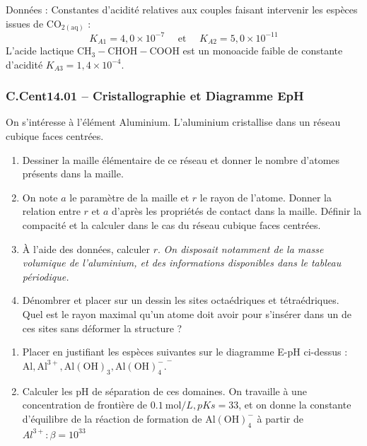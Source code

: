 Données :
Constantes d'acidité relatives aux couples faisant intervenir les espèces issues de $\mathrm{CO}_{2(\mathrm{aq})}$ :
$$
K_{A 1}=4,0 \times 10^{-7} \quad \text { et } \quad K_{A 2}=5,0 \times 10^{-11}
$$
L'acide lactique $\mathrm{CH}_3-\mathrm{CHOH}-\mathrm{COOH}$ est un monoacide faible de constante d'acidité $K_{A 3}=1,4 \times 10^{-4}$.

\newpage
\subsubsection*{C.Cent14.01 -- Cristallographie et Diagramme EpH  \lesdeux}

On s'intéresse à l'élément Aluminium. L'aluminium cristallise dans un réseau cubique faces centrées.

\begin{enumerate}
    \item Dessiner la maille élémentaire de ce réseau et donner le nombre d'atomes présents dans la maille.
    \item On note $a$ le paramètre de la maille et $r$ le rayon de l'atome. Donner la relation entre $r$ et $a$ d'après les propriétés de contact dans la maille. Définir la compacité et la calculer dans le cas du réseau cubique faces centrées.
    \item À l'aide des données, calculer $r$. \textit{On disposait notamment de la masse volumique de l'aluminium, et des informations disponibles dans le tableau périodique.}
    \item Dénombrer et placer sur un dessin les sites octaédriques et tétraédriques. Quel est le rayon maximal qu'un atome doit avoir pour s'insérer dans un de ces sites sans déformer la structure ?
\end{enumerate}
\begin{center}
\end{center}

\begin{enumerate}[resume]
\item Placer en justifiant les espèces suivantes sur le diagramme E-pH ci-dessus :
$
{\mathrm{Al}, \mathrm{Al}^{3+}, \mathrm{Al}(\mathrm{OH})_3, \mathrm{Al}(\mathrm{OH})_4^{-} .}^{-}
$
\item Calculer les pH de séparation de ces domaines. On travaille à une concentration de frontière de $0.1 \mathrm{~mol} / L, p K s=33$, et on donne la constante d'équilibre de la réaction de formation de $\mathrm{Al}(\mathrm{OH})_4^{-}$ à partir de $A l^{3+}: \beta=10^{33}$
\end{enumerate}

